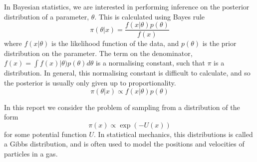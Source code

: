 In Bayesian statistics, we are interested in performing inference on the posterior distribution of a parameter, $\theta$.  This is calculated using Bayes rule
$$
\pi(\theta | x) = \frac{f(x | \theta) p(\theta)}{f(x)}
$$
where $f(x|\theta)$ is the likelihood function of the data, and $p(\theta)$ is the prior distribution on the parameter.  The term on the denominator, $f(x)=\int f(x)|\theta) p(\theta) d\theta$ is a normalising constant, such that $\pi$ is a distribution.  In general, this normalising constant is difficult to calculate, and so the posterior is usually only given up to proportionality.
$$
\pi(\theta | x) \propto f(x | \theta) p(\theta)
$$


In this report we consider the problem of sampling from a distribution of the form
	$$
	\pi (x) \propto \exp(-U(x))
	$$
for some potential function $U$.  In statistical mechanics, this distributions is called a Gibbs distribution, and is often used to model the positions and velocities of particles in a gas. 


